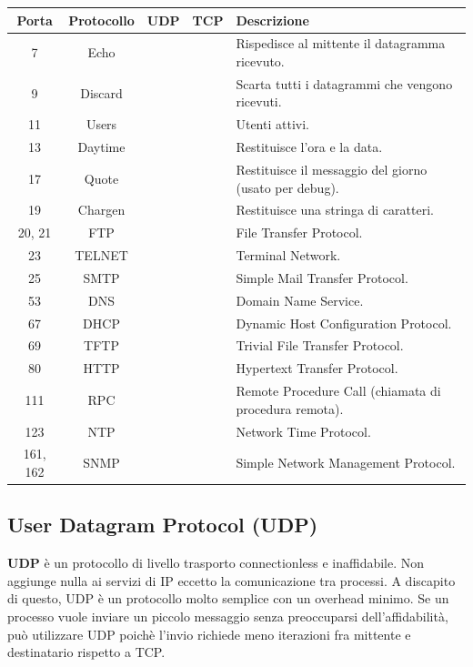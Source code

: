 \documentclass[12pt]{report}
\begin{document}
	\begin{table}[H]
		\begin{tabular}{|c|c|c|c|p{9cm}|}
		\hline
		\textbf{Porta} & \textbf{Protocollo} & \textbf{UDP} & \textbf{TCP} & \textbf{Descrizione} \\
		\hline
		7   & Echo       & \checkmark & \checkmark & Rispedisce al mittente il datagramma ricevuto. \\
		9   & Discard    & \checkmark & \checkmark & Scarta tutti i datagrammi che vengono ricevuti. \\
		11  & Users      &            & \checkmark & Utenti attivi. \\
		13  & Daytime    & \checkmark & \checkmark & Restituisce l'ora e la data. \\
		17  & Quote      & \checkmark & \checkmark & Restituisce il messaggio del giorno (usato per debug). \\
		19  & Chargen    & \checkmark & \checkmark & Restituisce una stringa di caratteri. \\
		20, 21 & FTP     &            & \checkmark & File Transfer Protocol. \\
		23  & TELNET     &            & \checkmark & Terminal Network. \\
		25  & SMTP       &            & \checkmark & Simple Mail Transfer Protocol. \\
		53  & DNS        & \checkmark & \checkmark & Domain Name Service. \\
		67  & DHCP       & \checkmark &            & Dynamic Host Configuration Protocol. \\
		69  & TFTP       & \checkmark &            & Trivial File Transfer Protocol. \\
		80  & HTTP       &            & \checkmark & Hypertext Transfer Protocol. \\
		111 & RPC        & \checkmark & \checkmark & Remote Procedure Call (chiamata di procedura remota). \\
		123 & NTP        & \checkmark &            & Network Time Protocol. \\
		161, 162 & SNMP  & \checkmark &            & Simple Network Management Protocol. \\
		\hline
		\end{tabular}
	\end{table}

	\subsection{User Datagram Protocol (UDP)}
	\textbf{UDP} è un protocollo di livello trasporto connectionless e inaffidabile. Non aggiunge nulla ai servizi di IP eccetto la comunicazione tra processi. A discapito di questo, UDP è un protocollo molto semplice con un overhead minimo. Se un processo vuole inviare un piccolo messaggio senza preoccuparsi dell'affidabilità, può utilizzare UDP poichè l'invio richiede meno iterazioni fra mittente e destinatario rispetto a TCP.
\end{document}
